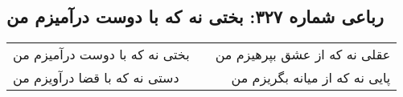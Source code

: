 \begin{center}
\section*{رباعی شماره ۳۲۷: بختی نه که با دوست درآمیزم من}
\label{sec:sh327}
\begin{longtable}{l p{0.5cm} r}
بختی نه که با دوست درآمیزم من
&&
عقلی نه که از عشق بپرهیزم من
\\
دستی نه که با قضا درآویزم من
&&
پایی نه که از میانه بگریزم من
\\
\end{longtable}
\end{center}
